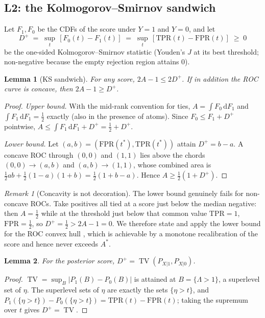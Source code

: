 \documentclass[11pt]{article}
\newtheorem{lemma}{Lemma}
\theoremstyle{definition}
\theoremstyle{remark}
\newtheorem{remark}{Remark}
\DeclareMathOperator{\TV}{TV}
\begin{document}
\subsection{L2: the Kolmogorov--Smirnov sandwich}

Let $F_1,F_0$ be the CDFs of the score under $Y=1$ and $Y=0$, and let
\[
D^+ \;=\; \sup_t\,[F_0(t)-F_1(t)] \;=\; \sup_t\,[\mathrm{TPR}(t)-\mathrm{FPR}(t)]\;\ge\;0
\]
be the one-sided Kolmogorov--Smirnov statistic (Youden's $J$ at its best
threshold; non-negative because the empty rejection region attains $0$).

\begin{lemma}[KS sandwich]
\label{lem:ks}
For any score, $2A-1\le 2D^+$. If in addition the ROC curve is concave, then
$2A-1\ge D^+$.
\end{lemma}

\begin{proof}
\emph{Upper bound.} With the mid-rank convention for ties,
$A=\int F_0\,\mathrm{d}F_1$ and $\int F_1\,\mathrm{d}F_1=\tfrac12$ exactly (also
in the presence of atoms). Since $F_0\le F_1+D^+$ pointwise,
$A\le \int F_1\,\mathrm{d}F_1+D^+=\tfrac12+D^+$.

\emph{Lower bound.} Let $(a,b)=(\mathrm{FPR}(t^*),\mathrm{TPR}(t^*))$ attain
$D^+=b-a$. A concave ROC through $(0,0)$ and $(1,1)$ lies above the chords
$(0,0)\to(a,b)$ and $(a,b)\to(1,1)$, whose combined area is
$\tfrac12 ab+\tfrac12(1-a)(1+b)=\tfrac12(1+b-a)$. Hence
$A\ge \tfrac12(1+D^+)$.
\end{proof}

\begin{remark}[Concavity is not decoration]
\label{rem:concave}
The lower bound genuinely fails for non-concave ROCs. Take positives all tied at
a score just below the median negative: then $A=\tfrac12$ while at the threshold
just below that common value $\mathrm{TPR}=1$, $\mathrm{FPR}=\tfrac12$, so
$D^+=\tfrac12>2A-1=0$. We therefore state and apply the lower bound for the ROC
convex hull \citep{provost2001robust}, which is achievable by a monotone
recalibration of the score and hence never exceeds $A^*$.
\end{remark}

\begin{lemma}
\label{lem:dtv}
For the posterior score, $D^+=\TV(P_{X|1},P_{X|0})$.
\end{lemma}

\begin{proof}
$\TV=\sup_B|P_1(B)-P_0(B)|$ is attained at $B=\{\Lambda>1\}$, a superlevel set of
$\eta$. The superlevel sets of $\eta$ are exactly the sets $\{\eta>t\}$, and
$P_1(\{\eta>t\})-P_0(\{\eta>t\})=\mathrm{TPR}(t)-\mathrm{FPR}(t)$; taking the
supremum over $t$ gives $D^+=\TV$.
\end{proof}
\end{document}
